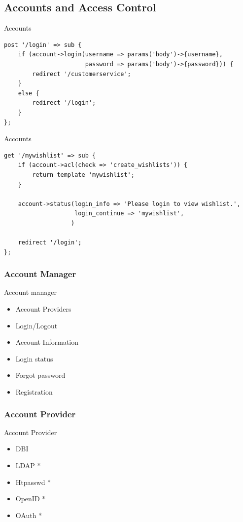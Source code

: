 \subsection{Accounts and Access Control}

\begin{frame}[fragile]{Accounts}
\begin{lstlisting}
post '/login' => sub {
    if (account->login(username => params('body')->{username},
                       password => params('body')->{password})) {
        redirect '/customerservice';
    }
    else {
        redirect '/login';
    }
};
\end{lstlisting}
\end{frame}

\begin{frame}[fragile]{Accounts}
\begin{lstlisting}
get '/mywishlist' => sub {
    if (account->acl(check => 'create_wishlists')) {
        return template 'mywishlist';
    }

    account->status(login_info => 'Please login to view wishlist.',
                    login_continue => 'mywishlist',
                   )

    redirect '/login';
};
\end{lstlisting}
\end{frame}

\subsubsection{Account Manager}
\begin{frame}{Account manager}
\begin{itemize}
\item Account Providers
\item Login/Logout
\item Account Information
\item Login status
\item Forgot password
\item Registration
\end{itemize}
\end{frame}

\subsubsection{Account Provider}
\begin{frame}{Account Provider}
\begin{itemize}
\item DBI 
\item LDAP *
\item Htpasswd * 
\item OpenID *
\item OAuth *
\end{itemize}
\end{frame}

